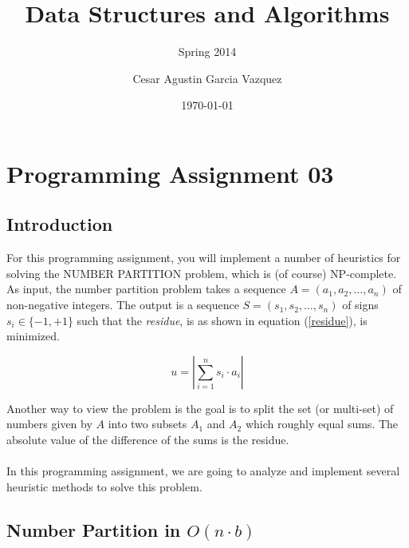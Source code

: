 \documentclass[tikz, 12pt]{scrartcl}
\title{Data Structures and Algorithms}
\subtitle{Spring 2014}
\author{Cesar Agustin Garcia Vazquez}
\date{\today}                                           %
\begin{document}
\maketitle
\section{Programming Assignment 03}

\subsection{Introduction}

For this programming assignment, you will implement a number of heuristics for solving the NUMBER PARTITION problem, which is (of course) NP-complete. As input, the number partition problem takes a sequence $A = (a_1, a_2, \ldots, a_n)$ of non-negative integers. The output is a sequence $S = (s_1, s_2, \ldots, s_n)$ of signs $s_i \in \{ -1, +1 \}$ such that the \textit{residue}, is as shown in equation (\ref{residue}), is minimized.

\begin{equation}\label{residue}
u = \left| \sum_{i = 1}^n s_i \cdot a_i \right|
\end{equation}

Another way to view the problem is the goal is to split the set (or multi-set) of numbers given by $A$ into two subsets $A_1$ and $A_2$ which roughly equal sums. The absolute value of the difference of the sums is the residue.\\
\\
In this programming assignment, we are going to analyze and implement several heuristic methods to solve this problem.

\subsection{Number Partition in $O(n \cdot b)$}
\end{document}
